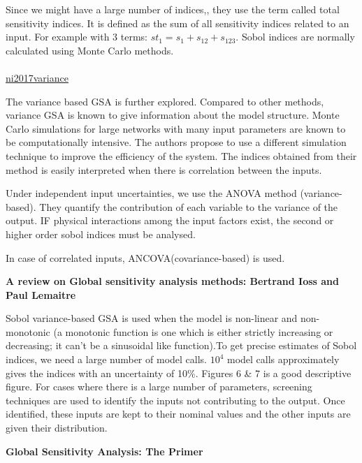 \documentclass[12pt, a4paper]{report}
\newcommand{\subrecord}[1]{\\{\href{./library/#1.pdf}{#1}}\bibentry{#1}\par\bigbreak}
\begin{document}
Since we might have a large number of indices,, they use the term called total sensitivity indices. It is defined as the sum of all sensitivity indices related to an input. For example with 3 terms: $st_1 = s_1 + s_{12} + s_{123}$. Sobol indices are normally calculated using Monte Carlo methods.\\
\subrecord{ni2017variance}
The variance based GSA is further explored. Compared to other methods, variance GSA is known to give information about the model structure. Monte Carlo simulations for large networks with many input parameters are known to be computationally intensive. The authors propose to use a different simulation technique to improve the efficiency of the system. The indices obtained from their method is easily interpreted when there is correlation between the inputs.

Under independent input uncertainties, we use the ANOVA method (variance-based). They quantify the contribution of each variable to the variance of the output. IF physical interactions among the input factors exist, the second or higher order sobol indices must be analysed. 

In case of correlated inputs, ANCOVA(covariance-based) is used. 

\textbf{A review on Global sensitivity analysis methods: Bertrand Ioss and Paul Lemaitre}

Sobol variance-based GSA is used when the model is non-linear and non-monotonic (a monotonic function is one which is either strictly increasing or decreasing; it can't be a sinusoidal like function).To get precise estimates of Sobol indices, we need a large number of model calls. $10^4$ model calls approximately gives the indices with an uncertainty of 10\%. Figures 6 \& 7 is a good descriptive figure. For cases where there is a large number of parameters, screening techniques are used to identify the inputs not contributing to the output. Once identified, these inputs are kept to their nominal values and the other inputs are given their distribution.

\textbf{Global Sensitivity Analysis: The Primer}


\end{document}
